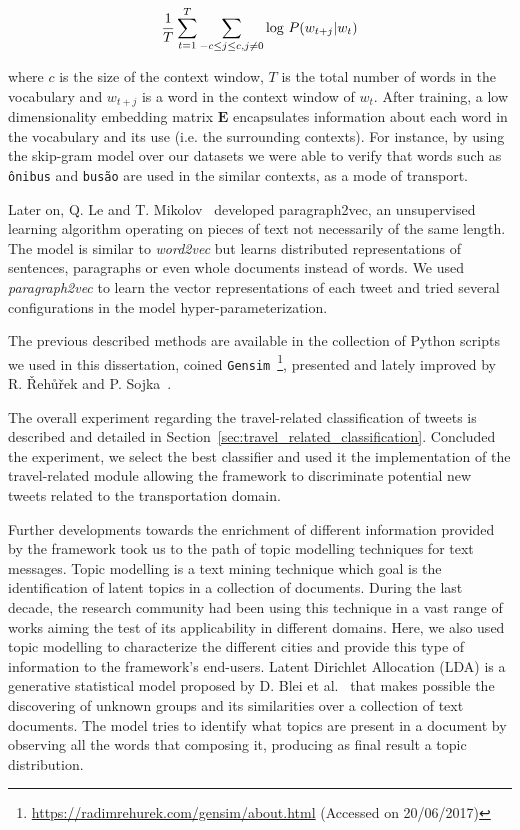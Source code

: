 \begin{equation}
\frac{1}{T}  \sum_{t=1}^{T}  \sum_{-c \leq j \leq  c, j \neq 0} \textnormal{log } P(w_{t+j} | w_t)
\end{equation}

where $c$ is the size of the context window, $T$ is the total number of words in the vocabulary and $w_{t+j}$ is a word in the context window of $w_t$. After training, a low dimensionality embedding matrix $\textbf{E}$ encapsulates information about each word in the vocabulary and its use (i.e. the surrounding contexts). For instance, by using the skip-gram model over our datasets we were able to verify that words such as \texttt{ônibus} and \texttt{busão} are used in the similar contexts, as a mode of transport.

Later on, Q. Le and T. Mikolov~\cite{le2014distributed} developed paragraph2vec, an unsupervised learning algorithm operating on pieces of text not necessarily of the same length. The model is similar to \emph{word2vec} but learns distributed representations of sentences, paragraphs or even whole documents instead of words. We used \emph{paragraph2vec} to learn the vector representations of each tweet and tried several configurations in the model hyper-parameterization.

The previous described methods are available in the collection of Python scripts we used in this dissertation, coined \texttt{Gensim}~\footnote{\url{https://radimrehurek.com/gensim/about.html} (Accessed on 20/06/2017)}, presented and lately improved by R. \v{R}eh\r{u}\v{r}ek and P. Sojka~\cite{rehurek2010software}.

The overall experiment regarding the travel-related classification of tweets is described and detailed in Section~\ref{sec:travel_related_classification}. Concluded the experiment, we select the best classifier and used it the implementation of the travel-related module allowing the framework to discriminate potential new tweets related to the transportation domain.

\medskip

Further developments towards the enrichment of different information provided by the framework took us to the path of topic modelling techniques for text messages. Topic modelling is a text mining technique which goal is the identification of latent topics in a collection of documents. During the last decade, the research community had been using this technique in a vast range of works aiming the test of its applicability in different domains. Here, we also used topic modelling to characterize the different cities and provide this type of information to the framework's end-users. Latent Dirichlet Allocation (LDA) is a generative statistical model proposed by D. Blei et al.~\cite{blei2003latent} that makes possible the discovering of unknown groups and its similarities over a collection of text documents. The model tries to identify what topics are present in a document by observing all the words that composing it, producing as final result a topic distribution. 

